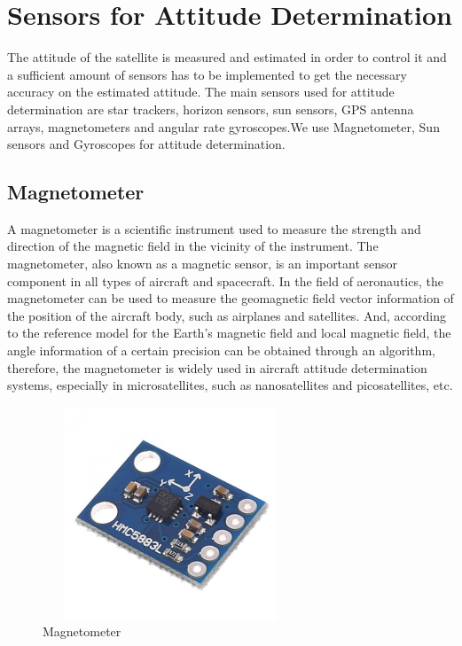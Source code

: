 \chapter{Sensors for Attitude Determination}

The attitude of the satellite is measured and estimated in order to control it and a sufficient amount of sensors has to be implemented to get the necessary accuracy on the estimated attitude. The main sensors used for attitude determination are star trackers, horizon sensors, sun sensors, GPS antenna arrays, magnetometers and angular rate gyroscopes.We use Magnetometer, Sun sensors and Gyroscopes for attitude determination. 


\section{Magnetometer}

A magnetometer is a scientific instrument used to measure the strength and direction of the magnetic field in the vicinity of the instrument. The magnetometer, also known as a magnetic sensor, is an important sensor component in all types of aircraft and spacecraft. In the field of aeronautics, the magnetometer can be used to measure the geomagnetic field vector information of the position of the aircraft body, such as airplanes and satellites. And, according to the reference model for the Earth’s magnetic field and local magnetic field, the angle information of a certain precision can be obtained through an algorithm, therefore, the magnetometer is widely used in aircraft attitude determination systems, especially in microsatellites, such as nanosatellites and picosatellites, etc.


\begin{figure}[h!]
	\centering
	\includegraphics[width=3in,height=2.5in]{./images/magnetometer.jpg}
	\caption{Magnetometer}
	\label{magnetometerimg}
\end{figure}


